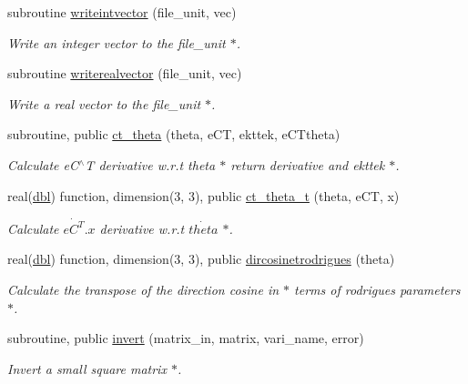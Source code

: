 \begin{DoxyCompactItemize}
subroutine \hyperlink{namespaceglobaldatafun_a08c5dd4cdc68f1694d0d44f76c4df0d5}{writeintvector} (file\+\_\+unit, vec)
\begin{DoxyCompactList}\small\item\em Write an integer vector to the file\+\_\+unit $\ast$. \end{DoxyCompactList}\item 
subroutine \hyperlink{namespaceglobaldatafun_a6a36231350f9af76a3a20cd590f6e40a}{writerealvector} (file\+\_\+unit, vec)
\begin{DoxyCompactList}\small\item\em Write a real vector to the file\+\_\+unit $\ast$. \end{DoxyCompactList}\item 
subroutine, public \hyperlink{namespaceglobaldatafun_a166b3774feeda05d1e3d1761c1412e85}{ct\+\_\+theta} (theta, e\+CT, ekttek, e\+C\+Ttheta)
\begin{DoxyCompactList}\small\item\em Calculate e\+C$^\wedge$T derivative w.\+r.\+t theta $\ast$ return derivative and ekttek $\ast$. \end{DoxyCompactList}\item 
real(\hyperlink{namespaceglobaldatafun_a5008801201dd34f2af8eae07756befb4}{dbl}) function, dimension(3, 3), public \hyperlink{namespaceglobaldatafun_a88e61f954347d95bbbbeb6b4aa6f2e8f}{ct\+\_\+theta\+\_\+t} (theta, e\+CT, x)
\begin{DoxyCompactList}\small\item\em Calculate $ \dot{eC^T}.x $ derivative w.\+r.\+t $ \dot{theta} $ $\ast$. \end{DoxyCompactList}\item 
real(\hyperlink{namespaceglobaldatafun_a5008801201dd34f2af8eae07756befb4}{dbl}) function, dimension(3, 3), public \hyperlink{namespaceglobaldatafun_a79e0439ba9c19e8c9bd28d76417cc4db}{dircosinetrodrigues} (theta)
\begin{DoxyCompactList}\small\item\em Calculate the transpose of the direction cosine in $\ast$ terms of rodrigues parameters $\ast$. \end{DoxyCompactList}\item 
subroutine, public \hyperlink{namespaceglobaldatafun_a1e393f2df119550fc86d1c0864fde446}{invert} (matrix\+\_\+in, matrix, vari\+\_\+name, error)
\begin{DoxyCompactList}\small\item\em Invert a small square matrix $\ast$. \end{DoxyCompactList}\item 

\end{DoxyCompactItemize}
